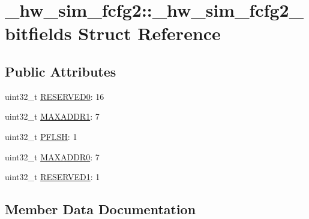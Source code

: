 \hypertarget{struct__hw__sim__fcfg2_1_1__hw__sim__fcfg2__bitfields}{}\section{\+\_\+hw\+\_\+sim\+\_\+fcfg2\+:\+:\+\_\+hw\+\_\+sim\+\_\+fcfg2\+\_\+bitfields Struct Reference}
\label{struct__hw__sim__fcfg2_1_1__hw__sim__fcfg2__bitfields}
\subsection*{Public Attributes}
\begin{DoxyCompactItemize}
\item 
uint32\+\_\+t \hyperlink{struct__hw__sim__fcfg2_1_1__hw__sim__fcfg2__bitfields_ab10334afd521f3d2f8c3f1ccdf002ee1}{R\+E\+S\+E\+R\+V\+E\+D0}\+: 16
\item 
uint32\+\_\+t \hyperlink{struct__hw__sim__fcfg2_1_1__hw__sim__fcfg2__bitfields_a23bd276f8bb41c40755db5243a67e804}{M\+A\+X\+A\+D\+D\+R1}\+: 7
\item 
uint32\+\_\+t \hyperlink{struct__hw__sim__fcfg2_1_1__hw__sim__fcfg2__bitfields_a52641fade41e2d42f5f3b3ae1180c9b2}{P\+F\+L\+SH}\+: 1
\item 
uint32\+\_\+t \hyperlink{struct__hw__sim__fcfg2_1_1__hw__sim__fcfg2__bitfields_a6643fc1c6c711e762982d8b95d754da5}{M\+A\+X\+A\+D\+D\+R0}\+: 7
\item 
uint32\+\_\+t \hyperlink{struct__hw__sim__fcfg2_1_1__hw__sim__fcfg2__bitfields_aaedbe79c816d1a629afa706cb7fb5a9a}{R\+E\+S\+E\+R\+V\+E\+D1}\+: 1
\end{DoxyCompactItemize}


\subsection{Member Data Documentation}
